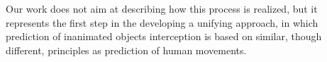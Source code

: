  

Our work does not aim at describing how this process is realized, but it represents the first step in the developing a unifying approach, in which prediction of inanimated objects interception is based on similar, though different, principles as prediction of human movements. 
 




